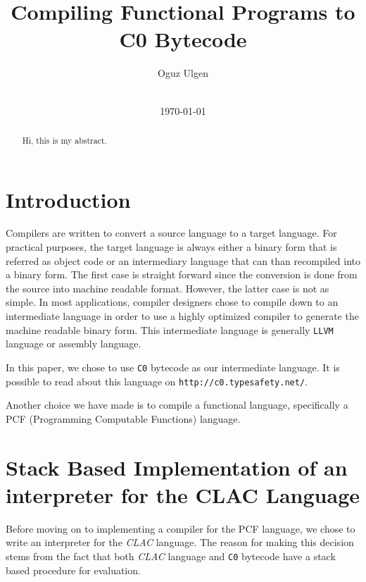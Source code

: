 \documentclass{acm_proc_article-sp}
\newcommand{\ccb}{\texttt{C0} bytecode }
\newcommand{\clac}{{\em CLAC} language }
\newcommand{\claci}{{\em CLAC} language}
\begin{document}
\title{Compiling Functional Programs to C0 Bytecode}

\author{
\alignauthor
Oguz Ulgen\\
       \\
}

\date{\today}

\maketitle
\begin{abstract}
Hi, this is my abstract.
\end{abstract}



\section{Introduction}
Compilers are written to convert a source language to a target language. For practical purposes, the target language is always either a binary form that is referred as object code or an intermediary language that can than recompiled into a binary form. The first case is straight forward since the conversion is done from the source into machine readable format. However, the latter case is not as simple. In most applications, compiler designers chose to compile down to an intermediate language in order to use a highly optimized compiler to generate the machine readable binary form. This intermediate language is generally \texttt{LLVM} language or assembly language.

In this paper, we chose to use \ccb as our intermediate language. It is possible to read about this language on \texttt{http://c0.typesafety.net/}.

Another choice we have made is to compile a functional language, specifically a PCF (Programming Computable Functions) language.

\section{Stack Based Implementation of an interpreter for the {\secit CLAC} Language}
Before moving on to implementing a compiler for the PCF language, we chose to write an interpreter for the \claci. The reason for making this decision stems from the fact that both \clac and \ccb have a stack based procedure for evaluation.
\end{document}
